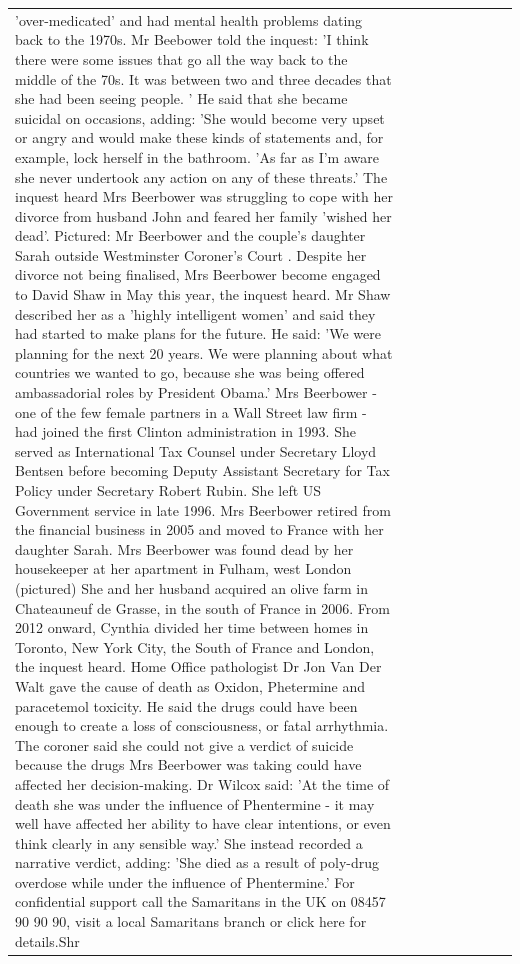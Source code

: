 \begin{table}[H]
\begin{tabular}{lllrlllll}
'over-medicated' and had mental health problems dating back to the 1970s. Mr Beebower told the inquest: 'I think there were some issues that go all the way back to the middle of the 70s. It was between two and three decades that she had been seeing people. ' He said that she became suicidal on occasions, adding: 'She would become very upset or angry and would make these kinds of statements and, for example, lock herself in the bathroom. 'As far as I'm aware she never undertook any action on any of these threats.' The inquest heard Mrs Beerbower was struggling to cope with her divorce from husband John and feared her family 'wished her dead'. Pictured: Mr Beerbower and the couple's daughter Sarah outside Westminster Coroner's Court . Despite her divorce not being finalised, Mrs Beerbower become engaged to David Shaw in May this year, the inquest heard. Mr Shaw described her as a 'highly intelligent women' and said they had started to make plans for the future. He said: 'We were planning for the next 20 years. We were planning about what countries we wanted to go, because she was being offered ambassadorial roles by President Obama.' Mrs Beerbower - one of the few female partners in a Wall Street law firm - had joined the first Clinton administration in 1993. She served as International Tax Counsel under Secretary Lloyd Bentsen before becoming Deputy Assistant Secretary for Tax Policy under Secretary Robert Rubin. She left US Government service in late 1996. Mrs Beerbower retired from the financial business in 2005 and moved to France with her daughter Sarah. Mrs Beerbower was found dead by her housekeeper at her apartment in Fulham, west London (pictured) She and her husband acquired an olive farm in Chateauneuf de Grasse, in the south of France in 2006. From 2012 onward, Cynthia divided her time between homes in Toronto, New York City, the South of France and London, the inquest heard. Home Office pathologist Dr Jon Van Der Walt gave the cause of death as Oxidon, Phetermine and paracetemol toxicity. He said the drugs could have been enough to create a loss of consciousness, or fatal arrhythmia. The coroner said she could not give a verdict of suicide because the drugs Mrs Beerbower was taking could have affected her decision-making. Dr Wilcox said: 'At the time of death she was under the influence of Phentermine - it may well have affected her ability to have clear intentions, or even think clearly in any sensible way.' She instead recorded a narrative verdict, adding: 'She died as a result of poly-drug overdose while under the influence of Phentermine.' For confidential support call the Samaritans in the UK on 08457 90 90 90, visit a local Samaritans branch or click here for details.Shr \\

\end{tabular}
\end{table}
